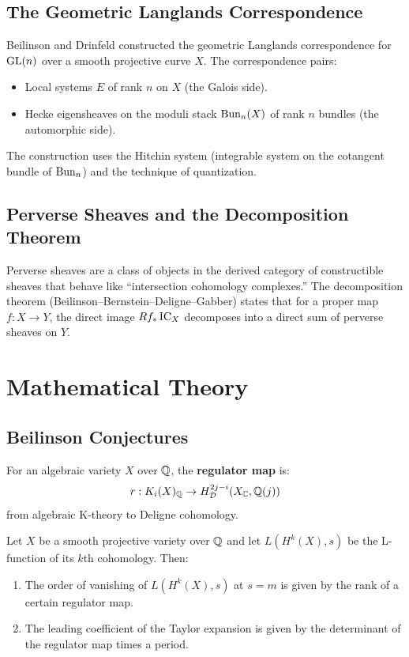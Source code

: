 \subsection{The Geometric Langlands Correspondence}

Beilinson and Drinfeld constructed the geometric Langlands correspondence for $\operatorname{GL}(n)$ over a smooth projective curve $X$. The correspondence pairs:
\begin{itemize}
    \item Local systems $E$ of rank $n$ on $X$ (the Galois side).
    \item Hecke eigensheaves on the moduli stack $\operatorname{Bun}_n(X)$ of rank $n$ bundles (the automorphic side).
\end{itemize}

The construction uses the Hitchin system (integrable system on the cotangent bundle of $\operatorname{Bun}_n$) and the technique of quantization.

\subsection{Perverse Sheaves and the Decomposition Theorem}

Perverse sheaves are a class of objects in the derived category of constructible sheaves that behave like ``intersection cohomology complexes.'' The decomposition theorem (Beilinson--Bernstein--Deligne--Gabber) states that for a proper map $f: X \to Y$, the direct image $Rf_* \operatorname{IC}_X$ decomposes into a direct sum of perverse sheaves on $Y$.

\section{Mathematical Theory}

\subsection{Beilinson Conjectures}

\begin{definition}
For an algebraic variety $X$ over $\mathbb{Q}$, the \textbf{regulator map} is:
\[
r: K_i(X)_{\mathbb{Q}} \to H^{2j-i}_{\mathcal{D}}(X_{\mathbb{C}}, \mathbb{Q}(j))
\]
from algebraic K-theory to Deligne cohomology.
\end{definition}

\begin{conjecture}[Beilinson, 1984]
Let $X$ be a smooth projective variety over $\mathbb{Q}$ and let $L(H^{k}(X), s)$ be the L-function of its $k$th cohomology. Then:
\begin{enumerate}
    \item The order of vanishing of $L(H^k(X), s)$ at $s = m$ is given by the rank of a certain regulator map.
    \item The leading coefficient of the Taylor expansion is given by the determinant of the regulator map times a period.
\end{enumerate}
\end{conjecture}

